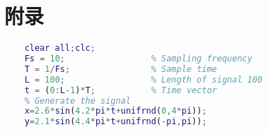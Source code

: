 \newpage
\section*{附录}

\begin{lstlisting}[language=matlab]      %%其中为matlab代码
    %%%100points
    clear all;clc;
    Fs = 10;                 % Sampling frequency
    T = 1/Fs;                % Sample time
    L = 100;                 % Length of signal 100
    t = (0:L-1)*T;           % Time vector
    % Generate the signal
    x=2.6*sin(4.2*pi*t+unifrnd(0,4*pi));
    y=2.1*sin(4.4*pi*t+unifrnd(-pi,pi));
\end{lstlisting}